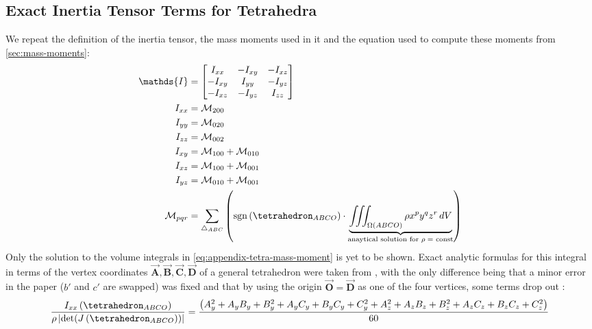\documentclass[oneside, a4paper]{book}
\newcommand\abs[1]{\left|#1\right|}
\newcommand\vek[1]{\vec{\bm{#1}}}
\newcommand\br[1]{\left(#1\right)}
\DeclareMathOperator{\sgn}{sgn}
\begin{document}
\begin{appendices}
  \chapter{Exact Inertia Tensor Terms for Tetrahedra}\label{chp:analytic-tetrahedron-inertia}
  We repeat the definition of the inertia tensor, the mass moments used in it and the equation used to compute these moments from \autoref{sec:mass-moments}:
  \begin{align}
    \mathds{I} &= \begin{bmatrix}
      I_{xx}&-I_{xy}&-I_{xz}\\
      -I_{xy}&I_{yy}&-I_{yz}\\
      -I_{xz}&-I_{yz}&I_{zz}
    \end{bmatrix}\\
    I_{xx} &= \mathcal{M}_{200}\\
    I_{yy} &= \mathcal{M}_{020}\\
    I_{zz} &= \mathcal{M}_{002}\\
    I_{xy} &= \mathcal{M}_{100} + \mathcal{M}_{010}\\
    I_{xz} &= \mathcal{M}_{100} + \mathcal{M}_{001}\\
    I_{yz} &= \mathcal{M}_{010} + \mathcal{M}_{001}\\
    \mathcal{M}_{pqr} &= \sum_{\triangle_{ABC}} \br{\sgn\br{\tetrahedron_{ABCO}} \cdot \underbrace{\iiint_{\Omega\br{ABCO}} \rho x^p y^q z^r  \,dV}_{\text{anaytical solution for $\rho=$ const}}}\label{eq:appendix-tetra-mass-moment}
  \end{align}
  Only the solution to the volume integrals in \autoref{eq:appendix-tetra-mass-moment} is yet to be shown. Exact analytic formulas for this integral in terms of the vertex coordinates $\vek{A},\vek{B},\vek{C},\vek{D}$ of a general tetrahedron were taken from \autocite[Tonon]{explicit-exact-tetrahedron-formulas}, with the only difference being that a minor error in the paper ($b'$ and $c'$ are swapped) was fixed and that by using the origin $\vek{O} = \vek{D}$ as one of the four vertices, some terms drop out \autocite{explicit-exact-tetrahedron-formulas}:
  \begin{align}
    \frac{I_{xx}\br{\tetrahedron_{ABCO}}}{\rho \abs{\det(J\br{\tetrahedron_{ABCO}})} } &= \frac{\br{
      A_y^2 + A_yB_y+B_y^2 + A_yC_y + B_yC_y + C_y^2 + 
      A_z^2 + A_zB_z+B_z^2 + A_zC_z + B_zC_z + C_z^2
    }}{60}\\

\end{align}
\end{appendices}
\end{document}
